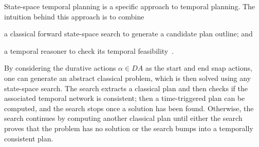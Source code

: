 State-space temporal planning is a specific approach to temporal planning. The intuition behind this approach is to combine
\begin{enumerate*}[label=\roman*)]
\item a classical forward state-space search to generate a candidate plan outline; and 
\item a temporal reasoner to check its temporal feasibility~\cite{DBLP:conf/ijcai/CushingKMW07,DBLP:journals/ai/ColesFHLS09,DBLP:journals/jair/ColesCFL12}.
\end{enumerate*}
%
By considering the durative actions $\alpha\in DA$ as the start and end snap actions, one can generate an abstract classical problem, which is then solved using any state-space search. 
%
The search extracts a classical plan and then checks if the associated temporal network is consistent; then a time-triggered plan can be computed, and the search stops once a solution has been found.
%
Otherwise, the search continues by computing another classical plan until either the search proves that the problem has no solution or the search bumps into a temporally consistent plan.


